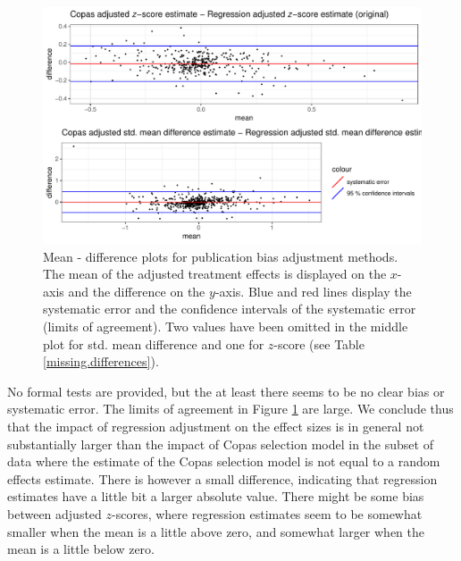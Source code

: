 \documentclass[11pt,a4paper,twoside]{book}\usepackage[]{graphicx}\usepackage[]{color}
\newenvironment{knitrout}{}{} %
\begin{document}
\begin{figure}
\begin{knitrout}
\color{fgcolor}

{\centering \includegraphics[width=\textwidth-3cm]{figure/ch03_figunnamed-chunk-25-1} 

}



\end{knitrout}
\caption{Mean - difference plots for publication bias adjustment methods. The mean of the adjusted treatment effects is displayed on the $x$-axis and the difference on the $y$-axis. Blue and red lines display the systematic error and the confidence intervals of the systematic error (limits of agreement). Two values have been omitted in the middle plot for std. mean difference and one for $z$-score (see Table \ref{missing.differences}).}
\label{fig:adjustment.mean.diff}
\end{figure}

No formal tests are provided, but the at least there seems to be no clear bias or systematic error. The limits of agreement in Figure \ref{fig:adjustment.mean.diff} are large. We conclude thus that the impact of regression adjustment on the effect sizes is in general not substantially larger than the impact of Copas selection model in the subset of data where the estimate of the Copas selection model is not equal to a random effects estimate. There is however a small difference, indicating that regression estimates have a little bit a larger absolute value. There might be some bias between adjusted $z$-scores, where regression estimates seem to be somewhat smaller when the mean is a little above zero, and somewhat larger when the mean is a little below zero. \\
\end{document}
